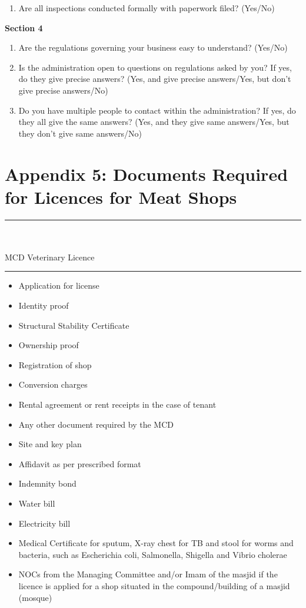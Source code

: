 \documentclass[a4paper, 12pt]{article}
\begin{document}
\begin{mdframed}[backgroundcolor=gray!20]
\begin{enumerate}[noitemsep]
\item Are all inspections conducted formally with paperwork filed? (Yes/No)
\end{enumerate}
\textbf {Section 4}
\begin{enumerate}[noitemsep]
\item Are the regulations governing your business easy to understand? (Yes/No)
\item Is the administration open to questions on regulations asked by you? If yes, do they give precise answers? (Yes, and give precise answers/Yes, but don’t give precise answers/No)
\item Do you have multiple people to contact within the administration? If yes, do they all give the same answers? (Yes, and they give same answers/Yes, but they don’t give same 
answers/No)
\end{enumerate} 
\end{mdframed}

\newpage
\section*{Appendix 5: Documents Required for Licences for Meat Shops}
\footnotesize
\noindent\rule{16cm}{0.4pt}\\
	\\
MCD Veterinary Licence\\
\noindent\rule{16cm}{0.4pt}
\begin{itemize}[noitemsep]
\item  Application for license
\item  Identity proof
\item  Structural Stability Certificate
\item  Ownership proof
\item  Registration of shop
\item  Conversion charges
\item  Rental agreement or rent receipts in the case of tenant
\item  Any other document required by the MCD
\item  Site and key plan
\item  Affidavit as per prescribed format
\item  Indemnity bond
\item  Water bill
\item  Electricity bill
\item  Medical Certificate for sputum, X-ray chest for TB and stool for worms and bacteria, such as Escherichia coli, Salmonella, Shigella and Vibrio cholerae
\item NOCs from the Managing Committee and/or Imam of the masjid if the licence is applied for a shop situated in the compound/building of a masjid (mosque)
\end{itemize}
\end{document}
